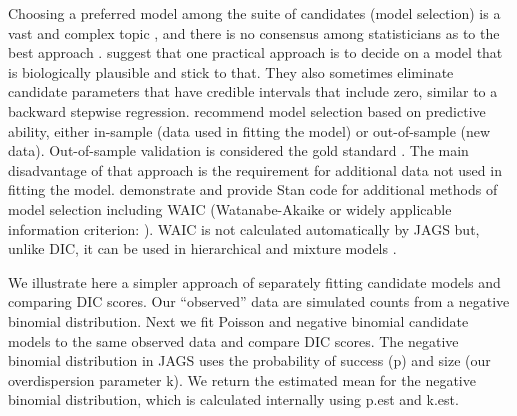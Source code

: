 \documentclass[
]{krantz}
\begin{document}
Choosing a preferred model among the suite of candidates (model selection) is a vast and complex topic \citep{link.barker_2010}, and there is no consensus among statisticians as to the best approach \citep{kéry.schaub_2012}. \citet{kéry.schaub_2012} suggest that one practical approach is to decide on a model that is biologically plausible and stick to that. They also sometimes eliminate candidate parameters that have credible intervals that include zero, similar to a backward stepwise regression. \citet{hooten.hobbs2015} recommend model selection based on predictive ability, either in-sample (data used in fitting the model) or out-of-sample (new data). Out-of-sample validation is considered the gold standard \citep{hooten.hobbs2015}. The main disadvantage of that approach is the requirement for additional data not used in fitting the model. \citet{doll.jacquemin_2019} demonstrate and provide Stan \citep{gelman.etal_2015} code for additional methods of model selection including WAIC (Watanabe-Akaike or widely applicable information criterion: \citet{watanabe_2010}). WAIC is not calculated automatically by JAGS but, unlike DIC, it can be used in hierarchical and mixture models \citep{gelman.etal_2014, hooten.hobbs2015}.

We illustrate here a simpler approach of separately fitting candidate models and comparing DIC scores. Our ``observed'' data are simulated counts from a negative binomial distribution. Next we fit Poisson and negative binomial candidate models to the same observed data and compare DIC scores. The negative binomial distribution in JAGS uses the probability of success (p) and size (our overdispersion parameter k). We return the estimated mean for the negative binomial distribution, which is calculated internally using p.est and k.est.
\end{document}
